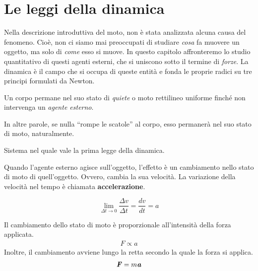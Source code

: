 \marginpar{\minitoc}

\section{Le leggi della dinamica}

Nella descrizione introduttiva del moto, non è stata analizzata alcuna causa del
fenomeno. Cioè, non ci siamo mai preoccupati di studiare \textit{cosa}
fa muovere un oggetto, ma solo di \textit{come} esso si muove. In
questo capitolo affronteremo lo studio quantitativo di questi agenti
esterni, che si uniscono sotto il termine di \textit{forze}. La dinamica
è il campo che si occupa di queste entità e fonda le proprie radici su
tre principi formulati da Newton.


\begin{tcolorbox}[colback = red!30, colframe = red!30!black, title = {Prima legge della dinamica (legge di inerzia)}]
    Un corpo permane nel suo stato di \textit{quiete} o moto rettilineo uniforme
    finché non intervenga un \textit{agente esterno}.
\end{tcolorbox}

\noindent In altre parole, se nulla ``rompe le scatole'' al corpo, esso permanerà nel suo
stato di moto, naturalmente.

\begin{tcolorbox}[colback = yellow!30, colframe = yellow!30!black, title = {Sistema inerziale}]
    Sistema nel quale vale la prima legge della dinamica.
\end{tcolorbox}

Quando l'agente esterno agisce sull'oggetto, l'effetto è un cambiamento nello
stato di moto di quell'oggetto. Ovvero, cambia la sua velocità. La variazione
della velocità nel tempo è chiamata \textbf{accelerazione}.

\[ \lim_{\Delta t \to 0} \frac{\Delta v}{\Delta t} = \frac{dv}{dt} = a \]


\begin{tcolorbox}[colback = red!30, colframe = red!30!black, title = {Seconda legge della dinamica}]
Il cambiamento dello stato di moto è proporzionale all'intensità della forza applicata.
    \begin{align}
        F \propto a
    \end{align}
Inoltre, il cambiamento avviene lungo la retta secondo la quale la forza
si applica.
    \begin{align}
        \textbf{\textit{F}} = m \textbf{\textit{a}}
    \end{align}
\end{tcolorbox}

